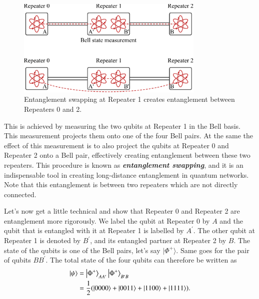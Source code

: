 \begin{figure}[t]
    \centering
    \includegraphics[width=0.8\textwidth]{lesson12/12-3_entanglement_swapping.pdf}
    \caption[Entanglement swapping]{Entanglement swapping at Repeater 1 creates entanglement between Repeaters 0 and 2.}
    \label{fig:12-3_entanglement_swapping}
\end{figure}

This is achieved by measuring the two qubits at Repeater 1 in the Bell basis.
This measurement projects them onto one of the four Bell pairs.
At the same the effect of this measurement is to also project the qubits at Repeater 0 and Repeater 2 onto a Bell pair, effectively creating entanglement between these two repeaters.
This procedure is known as \textit{\textbf{entanglement swapping}}, and it is an indispensable tool in creating long-distance entanglement in quantum networks.
Note that this entanglement is between two repeaters which are not directly connected.

Let's now get a little technical and show that Repeater 0 and Repeater 2 are entanglement more rigorously.
We label the qubit at Repeater 0 by $A$ and the qubit that is entangled with it at Repeater 1 is labelled by $A^{\prime}$.
The other qubit at Repeater 1 is denoted by $B^{\prime}$, and its entangled partner at Repeater 2 by $B$.
The state of the qubits is one of the Bell pairs, let's say $|\Phi^+\rangle$.
Same goes for the pair of qubits $BB^{\prime}$.
The total state of the four qubits can therefore be written as
\begin{align}
    \begin{aligned}
        \ket{\psi} & = \ket{\Phi^{+}}_{A A^{\prime}}\ket{\Phi^{+}}_{B^{\prime} B} \\
        & = \frac{1}{2} ( |0000\rangle+|0011\rangle+|1100\rangle+|1111\rangle ).
        \label{eq:12-3_computational_basis}
    \end{aligned}
\end{align}

